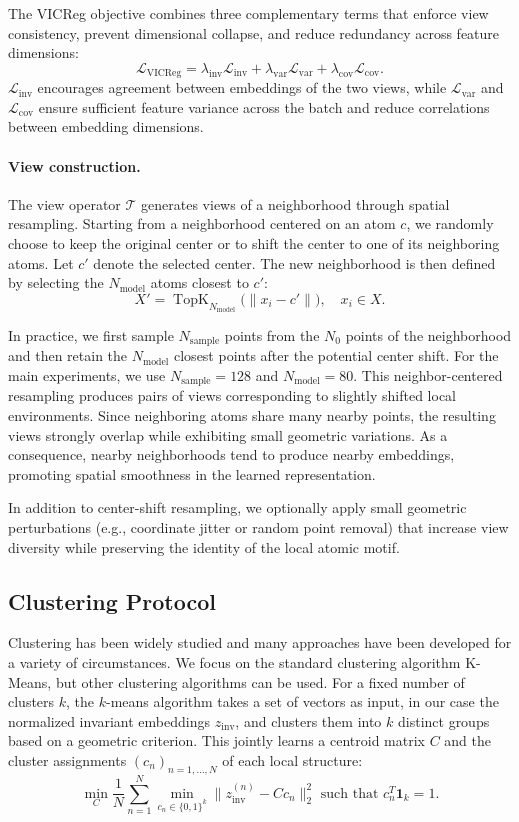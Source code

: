\documentclass[runningheads]{llncs}
\begin{document}
The VICReg objective combines three complementary terms that enforce view consistency, prevent dimensional collapse, and reduce redundancy across feature dimensions:
$$
\mathcal{L}_{\mathrm{VICReg}}
=
\lambda_{\mathrm{inv}}\mathcal{L}_{\mathrm{inv}}
+
\lambda_{\mathrm{var}}\mathcal{L}_{\mathrm{var}}
+
\lambda_{\mathrm{cov}}\mathcal{L}_{\mathrm{cov}}.
$$
$\mathcal{L}_{\mathrm{inv}}$ encourages agreement between embeddings of the two views, while $\mathcal{L}_{\mathrm{var}}$ and $\mathcal{L}_{\mathrm{cov}}$ ensure sufficient feature variance across the batch and reduce correlations between embedding dimensions.

\paragraph{View construction.}

The view operator $\mathcal{T}$ generates views of a neighborhood through spatial resampling.
Starting from a neighborhood centered on an atom $c$, we randomly choose to keep the original center or to shift the center to one of its neighboring atoms. Let $c'$ denote the selected center. The new neighborhood is then defined by selecting the $N_{\text{model}}$ atoms closest to $c'$:
$$
X' =
\operatorname{TopK}_{N_{\text{model}}}
\big(
\|x_i - c'\|
\big), \quad x_i\in X.
$$

In practice, we first sample $N_{\mathrm{sample}}$ points from the $N_0$ points of the neighborhood and then retain the $N_{\text{model}}$ closest points after the potential center shift. For the main experiments, we use $N_{\mathrm{sample}}=128$ and $N_{\text{model}}=80$. This neighbor-centered resampling produces pairs of views corresponding to slightly shifted local environments. Since neighboring atoms share many nearby points, the resulting views strongly overlap while exhibiting small geometric variations. As a consequence, nearby neighborhoods tend to produce nearby embeddings, promoting spatial smoothness in the learned representation.

In addition to center-shift resampling, we optionally apply small geometric perturbations (e.g., coordinate jitter or random point removal) that increase view diversity while preserving the identity of the local atomic motif.

\subsection{Clustering Protocol}
Clustering has been widely studied and many approaches have been developed for a variety of circumstances. We focus on the standard clustering algorithm K-Means, but
other clustering algorithms can be used. For a fixed number of clusters $k$, the $k$-means algorithm
takes a set of vectors as input, in our case the normalized invariant embeddings $z_{\mathrm{inv}}$, and clusters them into $k$ distinct groups based on a geometric criterion. This jointly learns a centroid matrix $C$ and the cluster
assignments $(c_n)_{n=1,\ldots,N}$ of each local structure:
$$ \min_C \frac1N \sum_{n=1}^N \min_{c_n \in\{0,1\}^k} \| z_{\text{inv}}^{(n)} - C c_n\|_2^2 \text{ such that } c_n^T \mathbf{1}_k = 1.$$
\end{document}
